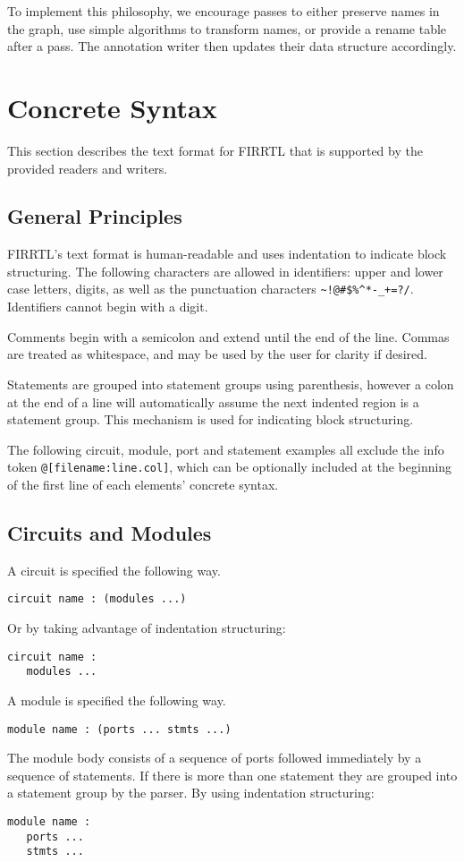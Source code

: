 \documentclass[12pt]{article}
\begin{document}
To implement this philosophy, we encourage passes to either preserve names in the graph, use simple algorithms to transform names, or provide a rename table after a pass.
The annotation writer then updates their data structure accordingly.

\section{Concrete Syntax}\label{concrete}
This section describes the text format for FIRRTL that is supported by the provided readers and writers.

\subsection*{General Principles}
FIRRTL's text format is human-readable and uses indentation to indicate block structuring.
The following characters are allowed in identifiers: upper and lower case letters, digits, as well as the punctuation characters \verb|~!@#$%^*-_+=?/|.
Identifiers cannot begin with a digit. 

Comments begin with a semicolon and extend until the end of the line.
Commas are treated as whitespace, and may be used by the user for clarity if desired. 

Statements are grouped into statement groups using parenthesis, however a colon at the end of a line will automatically assume the next indented region is a statement group.
This mechanism is used for indicating block structuring. 

The following circuit, module, port and statement examples all exclude the info token \verb|@[filename:line.col]|, which can be optionally included at the beginning of the first line of each elements' concrete syntax.

\subsection*{Circuits and Modules}
A circuit is specified the following way.
\begin{verbatim}
circuit name : (modules ...)
\end{verbatim}
Or by taking advantage of indentation structuring:
\begin{verbatim}
circuit name :
   modules ...
\end{verbatim}

A module is specified the following way.
\begin{verbatim}
module name : (ports ... stmts ...)
\end{verbatim}
The module body consists of a sequence of ports followed immediately by a sequence of statements.
If there is more than one statement they are grouped into a statement group by the parser. 
By using indentation structuring:
\begin{verbatim}
module name :
   ports ...
   stmts ...
\end{verbatim}
\end{document}
